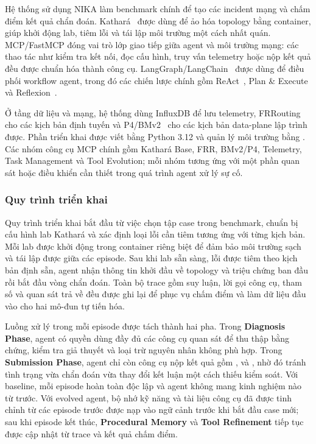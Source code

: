 Hệ thống sử dụng NIKA làm benchmark chính để tạo các incident mạng và chấm điểm kết quả chẩn đoán. Kathará~\citep{kathara2019} được dùng để ảo hóa topology bằng container, giúp khởi động lab, tiêm lỗi và tái lập môi trường một cách nhất quán. MCP/FastMCP đóng vai trò lớp giao tiếp giữa agent và môi trường mạng: các thao tác như kiểm tra kết nối, đọc cấu hình, truy vấn telemetry hoặc nộp kết quả đều được chuẩn hóa thành công cụ. LangGraph/LangChain~\citep{langgraph2024} được dùng để điều phối workflow agent, trong đó các chiến lược chính gồm ReAct~\citep{react2023}, Plan \& Execute và Reflexion~\citep{reflexion2023}.

Ở tầng dữ liệu và mạng, hệ thống dùng InfluxDB để lưu telemetry, FRRouting~\citep{frr2021} cho các kịch bản định tuyến và P4/BMv2~\citep{p4lang2014} cho các kịch bản data-plane lập trình được. Phần triển khai được viết bằng Python 3.12 và quản lý môi trường bằng . Các nhóm công cụ MCP chính gồm Kathará Base, FRR, BMv2/P4, Telemetry, Task Management và Tool Evolution; mỗi nhóm tương ứng với một phần quan sát hoặc điều khiển cần thiết trong quá trình agent xử lý sự cố.

\subsubsection{Quy trình triển khai}

Quy trình triển khai bắt đầu từ việc chọn tập case trong benchmark, chuẩn bị cấu hình lab Kathará và xác định loại lỗi cần tiêm tương ứng với từng kịch bản. Mỗi lab được khởi động trong container riêng biệt để đảm bảo môi trường sạch và tái lập được giữa các episode. Sau khi lab sẵn sàng, lỗi được tiêm theo kịch bản định sẵn, agent nhận thông tin khởi đầu về topology và triệu chứng ban đầu rồi bắt đầu vòng chẩn đoán. Toàn bộ trace gồm suy luận, lời gọi công cụ, tham số và quan sát trả về đều được ghi lại để phục vụ chấm điểm và làm dữ liệu đầu vào cho hai mô-đun tự tiến hóa.

Luồng xử lý trong mỗi episode được tách thành hai pha. Trong \textbf{Diagnosis Phase}, agent có quyền dùng đầy đủ các công cụ quan sát để thu thập bằng chứng, kiểm tra giả thuyết và loại trừ nguyên nhân không phù hợp. Trong \textbf{Submission Phase}, agent chỉ còn công cụ nộp kết quả gồm ,  và , nhờ đó tránh tình trạng vừa chẩn đoán vừa thay đổi kết luận một cách thiếu kiểm soát. Với baseline, mỗi episode hoàn toàn độc lập và agent không mang kinh nghiệm nào từ trước. Với evolved agent, bộ nhớ kỹ năng và tài liệu công cụ đã được tinh chỉnh từ các episode trước được nạp vào ngữ cảnh trước khi bắt đầu case mới; sau khi episode kết thúc, \textbf{Procedural Memory} và \textbf{Tool Refinement} tiếp tục được cập nhật từ trace và kết quả chấm điểm.

